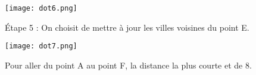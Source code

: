 \begin{figure}[h]
\begin{center}
    \texttt{[image: dot6.png]} 
    \caption{Étape 5 : On choisit de mettre à jour les villes voisines du point E.}
\end{center}
\end{figure}


\begin{figure}[h]
\begin{center}
    \texttt{[image: dot7.png]} 
    \caption{Pour aller du point A au point F, la distance la plus courte et de 8.}
\end{center}
\end{figure}
